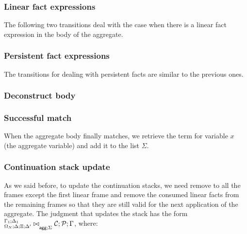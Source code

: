 \subsubsection{Linear fact expressions}

The following two transitions deal with the case when there is a linear
fact expression in the body of the aggregate.



\subsubsection{Persistent fact expressions}

The transitions for dealing with persistent facts are similar to the previous
ones.



\subsubsection{Deconstruct body}




\subsubsection{Successful match}

When the aggregate body finally matches, we retrieve the term for variable $x$
(the aggregate variable) and add it to the list $\Sigma$.



\subsubsection{Continuation stack update}

As we said before, to update the continuation stacks, we need remove to all the
frames except the first linear frame and remove the consumed linear facts from
the remaining frames so that they are still valid for the next application of
the aggregate.  The judgment that updates the stack has the form
${{}^{\Gamma_1 ; \Delta_1}_{\Omega_N ; \Delta; \Xi; \Delta'}\bowtie}_{\mathsf{agg} ; \Sigma} \; \mathcal{C};
   \mathcal{P} ; \Gamma$, where:

